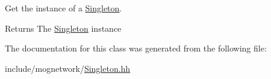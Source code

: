 Get the instance of a \hyperlink{classmognetwork_1_1_singleton}{Singleton}. 

\begin{DoxyReturn}{Returns}
The \hyperlink{classmognetwork_1_1_singleton}{Singleton} instance 
\end{DoxyReturn}


The documentation for this class was generated from the following file\-:\begin{DoxyCompactItemize}
\item 
include/mognetwork/\hyperlink{_singleton_8hh}{Singleton.\-hh}\end{DoxyCompactItemize}
